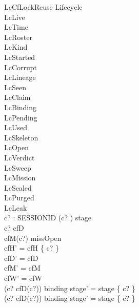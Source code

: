 \documentclass[a4paper,10pt,fleqn]{article}
\begin{document}
\begin{schema}{LcCfLockReuse}
\Delta Lifecycle \\
\Xi LcLive \\
\Xi LcTime \\
\Xi LcRoster \\
\Xi LcKind \\
\Xi LcStarted \\
\Xi LcCorrupt \\
\Xi LcLineage \\
\Xi LcSeen \\
\Xi LcClaim \\
\Xi LcBinding \\
\Xi LcPending \\
\Xi LcUsed \\
\Xi LcSkeleton \\
\Xi LcOpen \\
\Xi LcVerdict \\
\Xi LcSweep \\
\Xi LcMission \\
\Xi LcSealed \\
\Xi LcPurged \\
\Xi LcLeak \\
c? : SESSIONID
\where
(c? ) \in stage \\
c? \in \dom cfD \\
cfM(c?) \in missOpen \\
cfH' = cfH \cup \{ c? \} \\
cfD' = cfD \\
cfM' = cfM \\
cfW' = cfW \\
(c? \mapsto cfD(c?)) \in binding \implies stage' = stage \oplus \{ c?  \} \\
(c? \mapsto cfD(c?)) \notin binding \implies stage' = stage \oplus \{ c?  \}
\end{schema}
\end{document}
